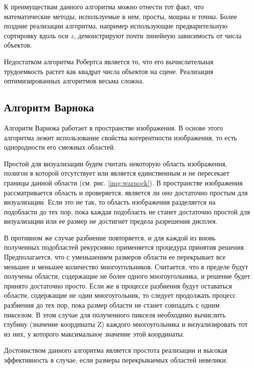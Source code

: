 К преимуществам данного алгоритма можно отнести тот факт, что математические методы, используемые в нем, просты, мощны и точны.
Более поздние реализации алгоритма, например использующие предварительную сортировку вдоль оси $z$, демонстрируют почти линейную зависимость от числа объектов.

Недостатком алгоритма Робертса является то, что его вычислительная трудоемкость растет как квадрат числа объектов на сцене.
Реализация оптимизированных алгоритмов весьма сложна.

\subsection{Алгоритм Варнока}

Алгоритм Варнока работает в пространстве изображения.
В основе этого алгоритма лежит использование свойства когерентности изображения, то есть однородности его смежных областей. \cite{Rogers}\cite{Newman}

Простой для визуализации будем считать некоторую область изображения, полигон в которой отсутствует или является единственным и не пересекает границы данной области (см. рис. \ref{img:warnock}).
В пространстве изображения рассматривается область и проверяется, является ли оно достаточно простым для визуализации.
Если это не так, то область изображения разделяется на подобласти до тех пор, пока каждая подобласть не станет достаточно простой для визуализации или ее размер не достигнет предела разрешения дисплея.


В противном же случае разбиение повторяется, и для каждой из вновь полученных подобластей рекурсивно применяется процедура принятия решения.
Предполагается, что с уменьшением размеров области ее перекрывает все меньшее и меньшее количество многоугольников.
Считается, что в пределе будут получены области, содержащие не более одного многоугольника, и решение будет принято достаточно просто.
Если же в процессе разбиения будут оставаться области, содержащие не один многоугольник, то следует продолжать процесс разбиения до тех пор, пока размер области не станет совпадать с одним пикселом.
В этом случае для полученного пикселя необходимо вычислить глубину (значение координаты Z) каждого многоугольника и визуализировать тот из них, у которого максимальное значение этой координаты.

Достоинством данного алгоритма является простота реализации и высокая эффективность в случае, если размеры перекрываемых областей невелики.

